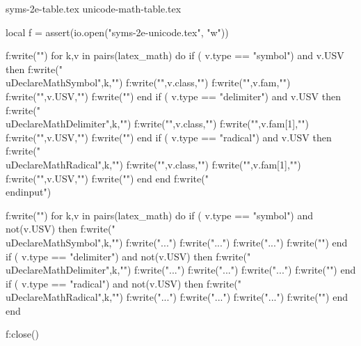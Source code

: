 \documentclass{article}
\begin{document}
\let\@@let\let
\def\ReadLet#1=#2{%
  \directlua{
    syn  = \luastring{\unexpanded{#1}}
    slot = \luastring{\unexpanded{#2}}
    latex_math[syn] = latex_math[slot]
    latex_math[syn]["copy-of"] = slot
    latex_math[slot]["synonym"] = syn
  }
}



\begingroup

\let\DeclareMathSymbol\ReadDeclareMathSymbol
\let\DeclareMathDelimiter\ReadDeclareMathDelimiter
\let\DeclareMathAccent\ReadDeclareMathAccent
\let\DeclareMathRadical\ReadDeclareMathRadical
\let\def\ReadDef
\let\UnicodeMathSymbol\ReadUnicodeMath
\let\let\ReadLet
\@@input syms-2e-table.tex\relax
\@@input unicode-math-table.tex\relax
\endgroup

\begin{luacode*}
local f = assert(io.open("syms-2e-unicode.tex", "w"))

f:write("\n")
for k,v in pairs(latex_math) do
  if ( v.type == "symbol") and v.USV then
    f:write("\\uDeclareMathSymbol{",k,"}")
    f:write("{",v.class,"}")
    f:write("{",v.fam,"}")
    f:write("{",v.USV,"}")
    f:write("\n")
  end
  if ( v.type == "delimiter") and v.USV then
    f:write("\\uDeclareMathDelimiter{",k,"}")
    f:write("{",v.class,"}")
    f:write("{",v.fam[1],"}")
    f:write("{",v.USV,"}")
    f:write("\n")
  end
  if ( v.type == "radical") and v.USV then
    f:write("\\uDeclareMathRadical{",k,"}")
    f:write("{",v.class,"}")
    f:write("{",v.fam[1],"}")
    f:write("{",v.USV,"}")
    f:write("\n")
  end
end
f:write("\n\\endinput\n")

f:write("\n")
for k,v in pairs(latex_math) do
  if ( v.type == "symbol") and not(v.USV) then
    f:write("\\uDeclareMathSymbol{",k,"}")
    f:write("{...}")
    f:write("{...}")
    f:write("{...}")
    f:write("\n")
  end
  if ( v.type == "delimiter") and not(v.USV) then
    f:write("\\uDeclareMathDelimiter{",k,"}")
    f:write("{...}")
    f:write("{...}")
    f:write("{...}")
    f:write("\n")
  end
  if ( v.type == "radical") and not(v.USV) then
    f:write("\\uDeclareMathRadical{",k,"}")
    f:write("{...}")
    f:write("{...}")
    f:write("{...}")
    f:write("\n")
  end
end

f:close()
\end{luacode*}
\end{document}
